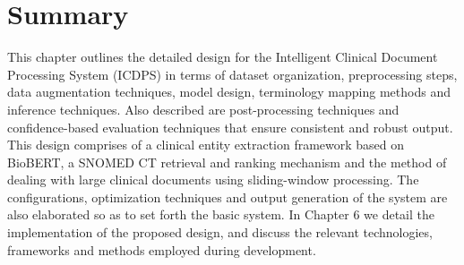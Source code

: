 \section*{Summary}

This chapter outlines the detailed design for the Intelligent Clinical Document Processing System (ICDPS) in terms of dataset organization, preprocessing steps, data augmentation techniques, model design, terminology mapping methods and inference techniques. Also described are post-processing techniques and confidence-based evaluation techniques that ensure consistent and robust output. This design comprises of a clinical entity extraction framework based on BioBERT, a SNOMED CT retrieval and ranking mechanism and the method of dealing with large clinical documents using sliding-window processing. The configurations, optimization techniques and output generation of the system are also elaborated so as to set forth the basic system. In Chapter 6 we detail the implementation of the proposed design, and discuss the relevant technologies, frameworks and methods employed during development.
